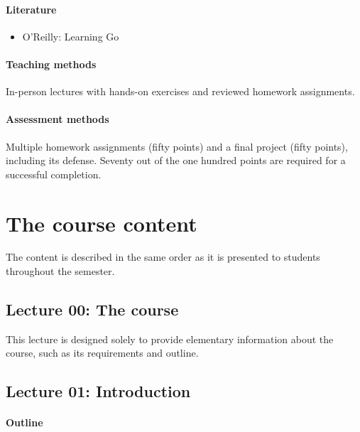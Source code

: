 \documentclass[
  digital,
  color,
  oneside,
  nosansbold,
  nocolorbold,
  lof,
  lot,
]{fithesis4}
\begin{document}
\subsubsection{Literature}

\begin{itemize}
    \item O'Reilly: Learning Go \cite{oreilly-learning-go}
\end{itemize}

\subsubsection{Teaching methods}

In-person lectures with hands-on exercises and reviewed homework assignments.

\subsubsection{Assessment methods}

Multiple homework assignments (fifty points) and a final project (fifty points), including its defense. Seventy out of the one hundred points are required for a successful completion.

\chapter{The course content}

The content is described in the same order as it is presented to students throughout the semester.

\section{Lecture 00: The course}

This lecture is designed solely to provide elementary information about the course, such as its requirements and outline.

\section{Lecture 01: Introduction}

\subsubsection{Outline}
\end{document}
